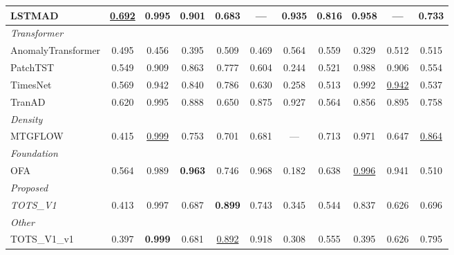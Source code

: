 \begin{table}[t]
\begin{tabular}{lcccccccccc}
LSTMAD & \underline{0.692} & 0.995 & 0.901 & 0.683 & --- & \textbf{0.935} & \textbf{0.816} & 0.958 & --- & 0.733 \\
\midrule
\multicolumn{11}{l}{\textit{Transformer}} \\
AnomalyTransformer & 0.495 & 0.456 & 0.395 & 0.509 & 0.469 & 0.564 & 0.559 & 0.329 & 0.512 & 0.515 \\
PatchTST & 0.549 & 0.909 & 0.863 & 0.777 & 0.604 & 0.244 & 0.521 & 0.988 & 0.906 & 0.554 \\
TimesNet & 0.569 & 0.942 & 0.840 & 0.786 & 0.630 & 0.258 & 0.513 & 0.992 & \underline{0.942} & 0.537 \\
TranAD & 0.620 & 0.995 & 0.888 & 0.650 & 0.875 & 0.927 & 0.564 & 0.856 & 0.895 & 0.758 \\
\midrule
\multicolumn{11}{l}{\textit{Density}} \\
MTGFLOW & 0.415 & \underline{0.999} & 0.753 & 0.701 & 0.681 & --- & 0.713 & 0.971 & 0.647 & \underline{0.864} \\
\midrule
\multicolumn{11}{l}{\textit{Foundation}} \\
OFA & 0.564 & 0.989 & \textbf{0.963} & 0.746 & 0.968 & 0.182 & 0.638 & \underline{0.996} & 0.941 & 0.510 \\
\midrule
\multicolumn{11}{l}{\textit{Proposed}} \\
\textit{TOTS\_V1} & 0.413 & 0.997 & 0.687 & \textbf{0.899} & 0.743 & 0.345 & 0.544 & 0.837 & 0.626 & 0.696 \\
\midrule
\multicolumn{11}{l}{\textit{Other}} \\
TOTS\_V1\_v1 & 0.397 & \textbf{0.999} & 0.681 & \underline{0.892} & 0.918 & 0.308 & 0.555 & 0.395 & 0.626 & 0.795 \\
\bottomrule
\end{tabular}
\end{table}
